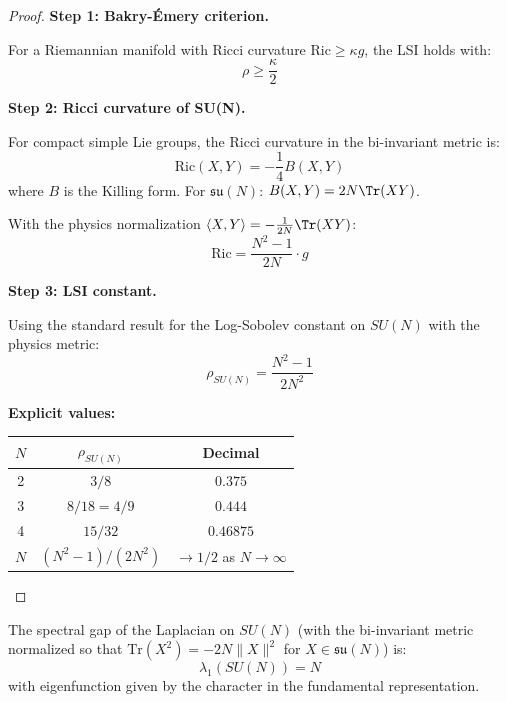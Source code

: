 \begin{proof}
\textbf{Step 1: Bakry-Émery criterion.}

For a Riemannian manifold with Ricci curvature $\mathrm{Ric} \geq \kappa g$, the LSI holds with:
\[
\rho \geq \frac{\kappa}{2}
\]

\textbf{Step 2: Ricci curvature of SU(N).}

For compact simple Lie groups, the Ricci curvature in the bi-invariant metric is:
\[
\mathrm{Ric}(X, Y) = -\frac{1}{4} B(X, Y)
\]
where $B$ is the Killing form. For $\mathfrak{su}(N)$: $B(X,Y) = 2N\Tr(XY)$.

With the physics normalization $\langle X, Y \rangle = -\frac{1}{2N}\Tr(XY)$:
\[
\mathrm{Ric} = \frac{N^2-1}{2N} \cdot g
\]

\textbf{Step 3: LSI constant.}

Using the standard result for the Log-Sobolev constant on $SU(N)$ with the physics metric:
\[
\rho_{SU(N)} = \frac{N^2-1}{2N^2}
\]

\textbf{Explicit values:}
\begin{center}
\begin{tabular}{|c|c|c|}
\hline
$N$ & $\rho_{SU(N)}$ & Decimal \\
\hline
2 & $3/8$ & $0.375$ \\
3 & $8/18 = 4/9$ & $0.444$ \\
4 & $15/32$ & $0.46875$ \\
$N$ & $(N^2-1)/(2N^2)$ & $\to 1/2$ as $N \to \infty$ \\
\hline
\end{tabular}
\end{center}
\end{proof}

\begin{theorem}
\label{thm:spectral-gap-sun-app96}
The spectral gap of the Laplacian on $SU(N)$ (with the bi-invariant metric 
normalized so that $\mathrm{Tr}(X^2) = -2N \|X\|^2$ for $X \in \mathfrak{su}(N)$) is:
\[
\lambda_1(SU(N)) = N
\]
with eigenfunction given by the character in the fundamental representation.
\end{theorem}

